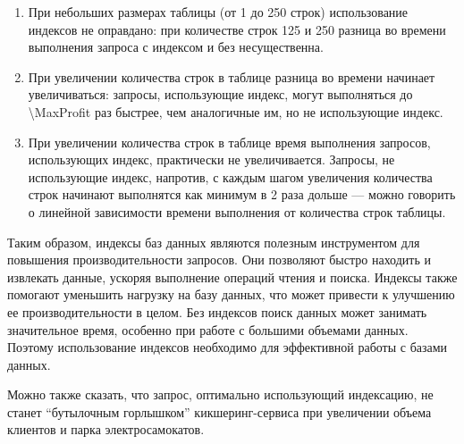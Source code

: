 \begin{enumerate}
    \item При небольших размерах таблицы (от 1 до 250 строк) использование индексов не оправдано: при количестве строк 125 и 250 разница во времени выполнения запроса с индексом и без несущественна.
    \item При увеличении количества строк в таблице разница во времени начинает увеличиваться: запросы, использующие индекс, могут выполняться до \num[round-precision=0]{\MaxProfit} раз быстрее, чем аналогичные им, но не использующие индекс.
    \item При увеличении количества строк в таблице время выполнения запросов, использующих индекс, практически не увеличивается. Запросы, не использующие индекс, напротив, с каждым шагом увеличения количества строк начинают выполнятся как минимум в 2 раза дольше --- можно говорить о линейной зависимости времени выполнения от количества строк таблицы.
\end{enumerate}

Таким образом, индексы баз данных являются полезным инструментом для повышения производительности запросов. Они позволяют быстро находить и извлекать данные, ускоряя выполнение операций чтения и поиска. Индексы также помогают уменьшить нагрузку на базу данных, что может привести к улучшению ее производительности в целом. Без индексов поиск данных может занимать значительное время, особенно при работе с большими объемами данных. Поэтому использование индексов необходимо для эффективной работы с базами данных.

Можно также сказать, что запрос, оптимально использующий индексацию, не станет \enquote{бутылочным горлышком} кикшеринг-сервиса при увеличении объема клиентов и парка электросамокатов.